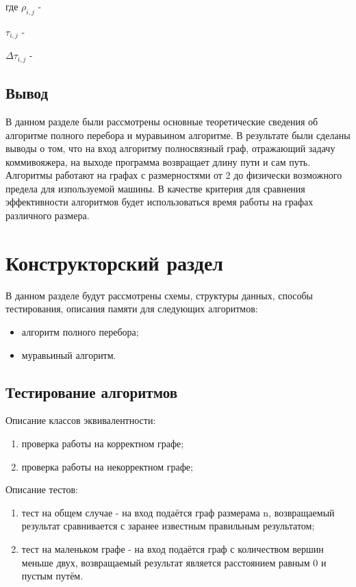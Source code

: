 где \quad$ \rho_{i,j}$ -  

    $\tau_{i,j}$ -  
    
    $\Delta \tau_{i,j}$ - 

\section{Вывод}
В данном разделе были рассмотрены основные теоретические сведения об алгоритме полного перебора и муравьином алгоритме. В результате были сделаны выводы о том, что на вход алгоритму полносвязный граф, отражающий задачу коммивояжера, на выходе программа возвращает длину пути и сам путь. Алгоритмы работают на графах с размерностями от 2 до физически возможного предела для изпользуемой машины. В качестве критерия для сравнения эффективности алгоритмов будет использоваться время работы на графах различного размера.

\chapter{Конструкторский раздел}

В данном разделе будут рассмотрены схемы, структуры данных, способы тестирования, описания памяти для следующих алгоритмов:
\begin{itemize}
	\item алгоритм полного перебора;
	\item муравьиный алгоритм.
\end{itemize}

\section{Тестирование алгоритмов}

Описание классов эквивалентности:
\begin{enumerate}
	\item проверка работы на корректном графе;
	\item проверка работы на некорректном графе;
\end{enumerate}

Описание тестов:
\begin{enumerate}
	\item тест на общем случае - на вход подаётся граф размерама n, возвращаемый результат сравнивается с заранее известным правильным результатом;
	\item тест на маленьком графе - на вход подаётся граф с количеством вершин меньше двух, возвращаемый результат является расстоянием равным 0 и пустым путём.
\end{enumerate}

